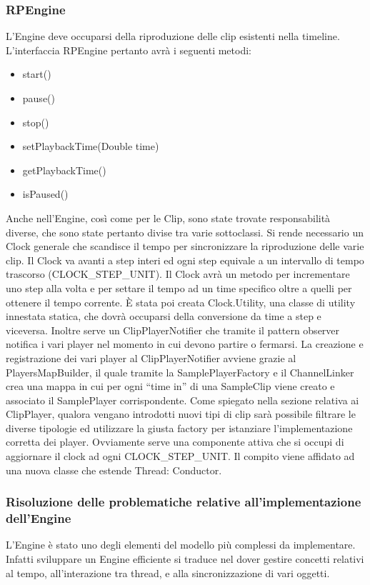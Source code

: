 \documentclass[a4paper,12pt]{report}
\begin{document}
\subsubsection{RPEngine}
L’Engine deve occuparsi della riproduzione delle clip esistenti nella timeline.
L’interfaccia RPEngine pertanto avrà i seguenti metodi:
\begin{itemize}
    \item start()
    \item pause()
    \item stop()
    \item setPlaybackTime(Double time)
    \item getPlaybackTime()
    \item isPaused()
\end{itemize}
Anche nell’Engine, così come per le Clip, sono state trovate responsabilità diverse, che sono state pertanto divise tra varie sottoclassi.
Si rende necessario un Clock generale che scandisce il tempo per sincronizzare la riproduzione delle varie clip.
Il Clock va avanti a step interi ed ogni step equivale a un intervallo di tempo trascorso (CLOCK\_STEP\_UNIT).
Il Clock avrà un metodo per incrementare uno step alla volta e per settare il tempo ad un time specifico oltre a quelli per ottenere il tempo corrente.
È stata poi creata Clock.Utility, una classe di utility innestata statica, che dovrà occuparsi della conversione da time a step e viceversa.
Inoltre serve un ClipPlayerNotifier che tramite il pattern observer notifica i vari player nel momento in cui devono partire o fermarsi.
La creazione e registrazione dei vari player al ClipPlayerNotifier avviene grazie al PlayersMapBuilder, il quale tramite la SamplePlayerFactory e il ChannelLinker crea una mappa in cui per ogni “time in” di una SampleClip viene creato e associato il SamplePlayer corrispondente.
Come spiegato nella sezione relativa ai ClipPlayer, qualora vengano introdotti nuovi tipi di clip sarà possibile filtrare le diverse tipologie ed utilizzare la giusta factory per istanziare l’implementazione corretta dei player.
Ovviamente serve una componente attiva che si occupi di aggiornare il clock ad ogni CLOCK\_STEP\_UNIT. Il compito viene affidato ad una nuova classe che estende Thread: Conductor.

\subsubsection{Risoluzione delle problematiche relative all’implementazione dell’Engine}
L’Engine è stato uno degli elementi del modello più complessi da implementare. Infatti sviluppare un Engine efficiente si traduce nel dover gestire concetti relativi al tempo, all’interazione tra thread, e alla sincronizzazione di vari oggetti.
\end{document}
